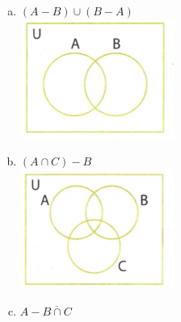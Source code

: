\documentclass[a4paper,14pt]{article}
\begin{document}
\begin{multicols}{2}
\begin{enumerate}
\begin{enumerate}[a)]
   				\item $(A - B) \cup (B - A)$ \\
   				\includegraphics[width=1\linewidth]{6FMA73_imagens/imagem13}
   				\item $(A \cap C) - B$ \\
   				\includegraphics[width=1\linewidth]{6FMA73_imagens/imagem14}
   				\item $A - \overline{B \cap C}$ \\

\end{enumerate}
\end{enumerate}
\end{multicols}
\end{document}
